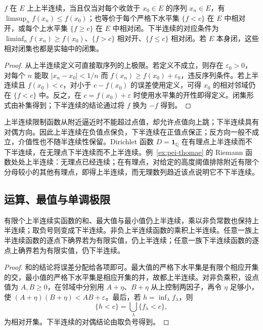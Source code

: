 \begin{proposition}
\label{prop:pei-semicontinuity-characterization}
$f$ 在 $E$ 上上半连续，当且仅当对每个收敛于 $x_0\in E$ 的序列 $x_n\in E$，有 $\limsup_nf(x_n)\le f(x_0)$；也等价于每个严格下水平集 $\{f<c\}$ 在 $E$ 中相对开，或每个上水平集 $\{f\ge c\}$ 在 $E$ 中相对闭。下半连续的对应条件为 $\liminf_nf(x_n)\ge f(x_0)$、$\{f>c\}$ 相对开、$\{f\le c\}$ 相对闭。若 $E$ 本身闭，这些相对闭集也都是实轴中的闭集。
\end{proposition}

\begin{proof}
从上半连续定义可直接取序列的上极限。若定义不成立，则存在 $\varepsilon_0>0$，对每个 $n$ 能取 $|x_n-x_0|<1/n$ 而 $f(x_n)\ge f(x_0)+\varepsilon_0$，违反序列条件。若上半连续且 $f(x_0)<c$，对小于 $c-f(x_0)$ 的误差使用定义，可得 $x_0$ 的相对邻域仍在 $\{f<c\}$ 中。反之，在 $c=f(x_0)+\varepsilon$ 时使用水平集的开性即得定义。闭集形式由补集得到；下半连续的结论通过将 $f$ 换为 $-f$ 得到。
\end{proof}

上半连续限制函数从附近逼近时不能超过点值，却允许点值向上跳；下半连续具有对偶方向。因此上半连续在负值点保负，下半连续在正值点保正；反方向一般不成立，介值性也不随半连续性保留。Dirichlet 函数 $D=\boldsymbol{1}_{\mathbb Q}$ 在有理点上半连续而不下半连续，在无理点下半连续而不上半连续。例~\ref{ex:pei-thomae} 的 Riemann 函数处处上半连续：无理点已经连续；在有理点，对给定的高度阈值排除附近有限个分母较小的其他有理点，即得上半连续，而无理数列趋近该点说明它不下半连续。

\subsection{运算、最值与单调极限}

\begin{proposition}
有限个上半连续实函数的和、最大值与最小值仍上半连续，乘以非负常数也保持上半连续；取负号则变成下半连续。非负上半连续函数的乘积上半连续。任意一族上半连续函数的逐点下确界若为有限实值，仍上半连续；任意一族下半连续函数的逐点上确界若为有限实值，仍下半连续。
\end{proposition}

\begin{proof}
和的结论将误差分配给各项即可。最大值的严格下水平集是有限个相应开集的交，最小值的严格下水平集是相应开集的并，故都上半连续。对非负乘积，设点值为 $A,B\ge0$，在邻域中分别用 $A+\eta$、$B+\eta$ 从上控制两因子，再令 $\eta$ 足够小，使 $(A+\eta)(B+\eta)<AB+\varepsilon$。最后，若 $h=\inf_{\lambda}f_\lambda$，则
\[
\{h<c\}=\bigcup_\lambda\{f_\lambda<c\},
\]
为相对开集。下半连续的对偶结论由取负号得到。
\end{proof}

